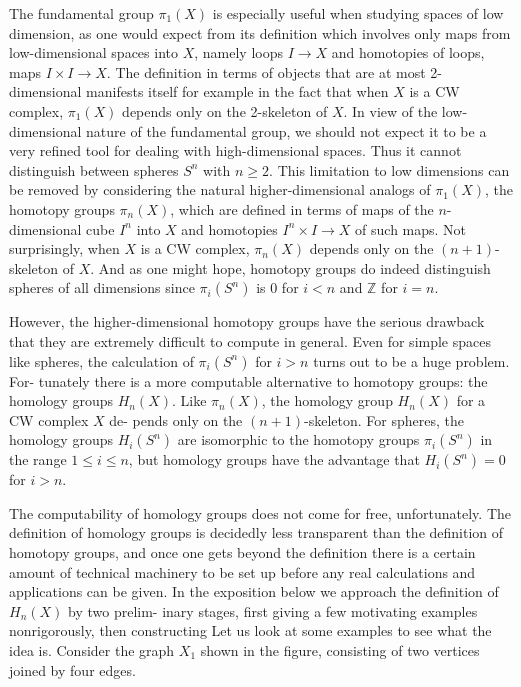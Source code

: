 The fundamental group $\pi_1(X)$ is especially useful when studying spaces of low
dimension, as one would expect from its definition which involves only maps from
low-dimensional spaces into $X$, namely loops $I \to X$ and homotopies of loops, maps
$I \times I \to X$. The definition in terms of objects that are at most 2-dimensional manifests
itself for example in the fact that when $X$ is a CW complex, $\pi_1(X)$ depends only on
the 2-skeleton of $X$. In view of the low-dimensional nature of the fundamental group,
we should not expect it to be a very refined tool for dealing with high-dimensional
spaces. Thus it cannot distinguish between spheres $S^n$ with $n \geq 2$. This limitation
to low dimensions can be removed by considering the natural higher-dimensional
analogs of $\pi_1(X)$, the homotopy groups $\pi_n(X)$, which are defined in terms of maps
of the $n$-dimensional cube $I^n$ into $X$ and homotopies $I^n \times I \to X$ of such maps. Not
surprisingly, when $X$ is a CW complex, $\pi_n(X)$ depends only on the $(n+1)$-skeleton
of $X$. And as one might hope, homotopy groups do indeed distinguish spheres of all
dimensions since $\pi_i(S^n)$ is 0 for $i < n$ and $\mathbb{Z}$ for $i = n$.

However, the higher-dimensional homotopy groups have the serious drawback
that they are extremely difficult to compute in general. Even for simple spaces like
spheres, the calculation of $\pi_i(S^n)$ for $i > n$ turns out to be a huge problem. For-
tunately there is a more computable alternative to homotopy groups: the homology
groups $H_n(X)$. Like $\pi_n(X)$, the homology group $H_n(X)$ for a CW complex $X$ de-
pends only on the $(n+1)$-skeleton. For spheres, the homology groups $H_i(S^n)$ are
isomorphic to the homotopy groups $\pi_i(S^n)$ in the range $1 \leq i \leq n$, but homology
groups have the advantage that $H_i(S^n) = 0$ for $i > n$.

The computability of homology groups does not come for free, unfortunately.
The definition of homology groups is decidedly less transparent than the definition
of homotopy groups, and once one gets beyond the definition there is a certain amount
of technical machinery to be set up before any real calculations and applications can
be given. In the exposition below we approach the definition of $H_n(X)$ by two prelim-
inary stages, first giving a few motivating examples nonrigorously, then constructing
Let us look at some examples to see what the idea is. Consider the graph $X_1$ shown in the figure, consisting of two vertices joined by four edges.



